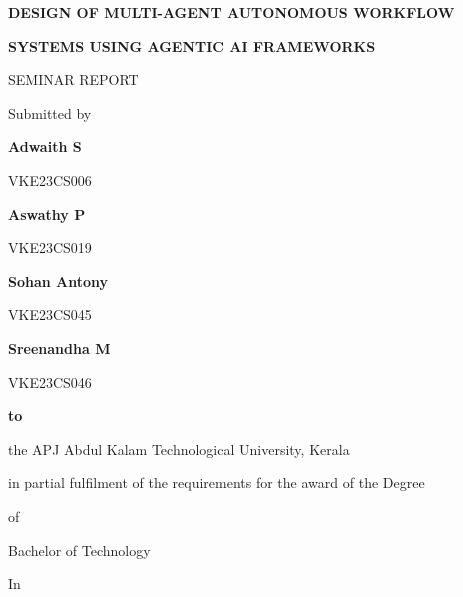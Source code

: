 \documentclass[12pt,letterpaper]{article}
\begin{document}
\thispagestyle{empty}
\begin{center}
  \vspace*{-16pt}
  {\fontsize{15pt}{17.5pt}\selectfont\bfseries DESIGN OF MULTI-AGENT AUTONOMOUS WORKFLOW\par}
  \vspace{2pt}
  {\fontsize{15pt}{17.5pt}\selectfont\bfseries SYSTEMS USING AGENTIC AI FRAMEWORKS\par}
  \vspace{14pt}
  {\fontsize{11.3pt}{14pt}\selectfont SEMINAR REPORT\par}
  \vspace{10pt}
  {\fontsize{11.3pt}{14pt}\selectfont Submitted by\par}
  \vspace{10pt}
  {\fontsize{12.5pt}{15pt}\selectfont\bfseries Adwaith S\par}
  {\fontsize{10.8pt}{13pt}\selectfont VKE23CS006\par}
  {\fontsize{12.5pt}{15pt}\selectfont\bfseries Aswathy P\par}
  {\fontsize{10.8pt}{13pt}\selectfont VKE23CS019\par}
  {\fontsize{12.5pt}{15pt}\selectfont\bfseries Sohan Antony\par}
  {\fontsize{10.8pt}{13pt}\selectfont VKE23CS045\par}
  {\fontsize{12.5pt}{15pt}\selectfont\bfseries Sreenandha M\par}
  {\fontsize{10.8pt}{13pt}\selectfont VKE23CS046\par}
  \vspace{16pt}
  {\fontsize{13.2pt}{16pt}\selectfont\bfseries to\par}
  \vspace{8pt}
  {\fontsize{11.3pt}{14pt}\selectfont the APJ Abdul Kalam Technological University, Kerala\par}
  \vspace{6pt}
  {\fontsize{11.3pt}{14pt}\selectfont in partial fulfilment of the requirements for the award of the Degree\par}
  \vspace{6pt}
  {\fontsize{11.3pt}{14pt}\selectfont of\par}
  \vspace{14pt}
  {\fontsize{11.3pt}{14pt}\selectfont Bachelor of Technology\par}
  \vspace{6pt}
  {\fontsize{11.3pt}{14pt}\selectfont In\par}

\end{center}
\end{document}

